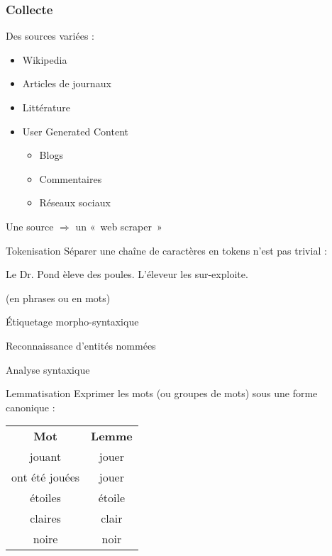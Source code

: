 \begin{frame}
  \frametitle{Collecte}
  Des sources variées :
  \begin{itemize}
  \item Wikipedia
  \item Articles de journaux
  \item Littérature
  \item User Generated Content
    \begin{itemize}
    \item Blogs
    \item Commentaires
    \item Réseaux sociaux
    \end{itemize}
  \end{itemize}
  Une source $\Rightarrow$ un «~web scraper~»
\end{frame}

\begin{frame}{Tokenisation}
  Séparer une chaîne de caractères en tokens n'est pas trivial :

  \begin{center}
    Le Dr. Pond èleve des poules. L'éleveur les sur-exploite.
  \end{center}

  (en phrases ou en mots)
\end{frame}

\begin{frame}{Étiquetage morpho-syntaxique}
\end{frame}

\begin{frame}{Reconnaissance d'entités nommées}
\end{frame}

\begin{frame}{Analyse syntaxique}
\end{frame}

\begin{frame}{Lemmatisation}
  Exprimer les mots (ou groupes de mots) sous une forme canonique : \\

  \centering
  \begin{tabular}{cc}
    \textbf{Mot} & \textbf{Lemme} \\
    jouant & jouer \\
    ont été jouées & jouer \\
    étoiles & étoile \\
    claires & clair \\
    noire & noir
  \end{tabular}
\end{frame}

